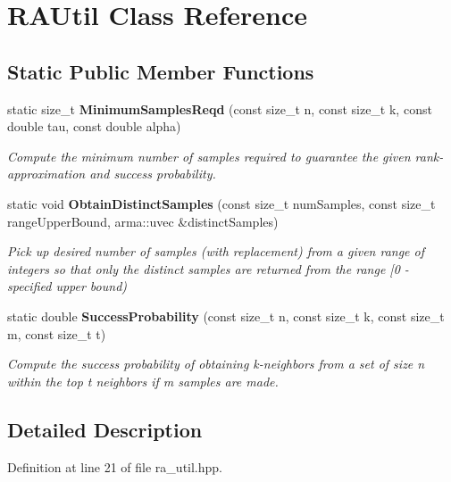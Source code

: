 \section{R\+A\+Util Class Reference}
\label{classmlpack_1_1neighbor_1_1RAUtil}
\subsection*{Static Public Member Functions}
\begin{DoxyCompactItemize}
\item 
static size\+\_\+t \textbf{ Minimum\+Samples\+Reqd} (const size\+\_\+t n, const size\+\_\+t k, const double tau, const double alpha)
\begin{DoxyCompactList}\small\item\em Compute the minimum number of samples required to guarantee the given rank-\/approximation and success probability. \end{DoxyCompactList}\item 
static void \textbf{ Obtain\+Distinct\+Samples} (const size\+\_\+t num\+Samples, const size\+\_\+t range\+Upper\+Bound, arma\+::uvec \&distinct\+Samples)
\begin{DoxyCompactList}\small\item\em Pick up desired number of samples (with replacement) from a given range of integers so that only the distinct samples are returned from the range [0 -\/ specified upper bound) \end{DoxyCompactList}\item 
static double \textbf{ Success\+Probability} (const size\+\_\+t n, const size\+\_\+t k, const size\+\_\+t m, const size\+\_\+t t)
\begin{DoxyCompactList}\small\item\em Compute the success probability of obtaining \textquotesingle{}k\textquotesingle{}-\/neighbors from a set of size \textquotesingle{}n\textquotesingle{} within the top \textquotesingle{}t\textquotesingle{} neighbors if \textquotesingle{}m\textquotesingle{} samples are made. \end{DoxyCompactList}\end{DoxyCompactItemize}


\subsection{Detailed Description}


Definition at line 21 of file ra\+\_\+util.\+hpp.



